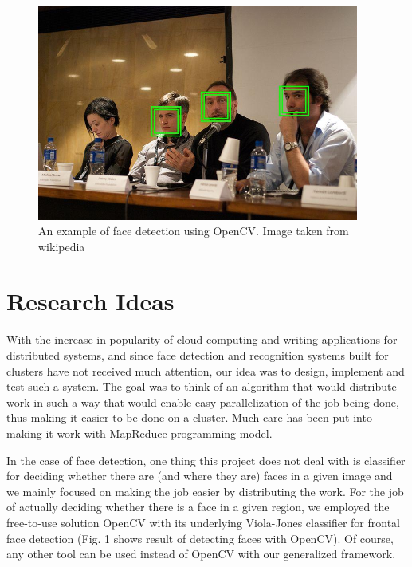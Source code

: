 \documentclass[11pt, draftclsnofoot, onecolumn]{IEEEtran}
\begin{document}
\begin{figure}[t]
\centering
\includegraphics[width=300pt]{img2}
\caption{An example of face detection using OpenCV. Image taken from wikipedia \cite{wikiImage}}
\end{figure}

\section{Research Ideas}  \label{sec:ideas}

With the increase in popularity of cloud computing and writing applications for distributed systems, and since face detection and recognition systems built for clusters have not received much attention, our idea was to design, implement and test such a system. The goal was to think of an algorithm that would distribute work in such a way that would enable easy parallelization of the job being done, thus making it easier to be done on a cluster. Much care has been put into making it work with MapReduce programming model.

In the case of face detection, one thing this project does not deal with is classifier for deciding whether there are (and where they are) faces in a given image and we mainly focused on making the job easier by distributing the work. For the job of actually deciding whether there is a face in a given region, we employed the free-to-use solution OpenCV with its underlying Viola-Jones classifier for frontal face detection (Fig. 1 shows result of detecting faces with OpenCV). Of course, any other tool can be used instead of OpenCV with our generalized framework.
\end{document}

